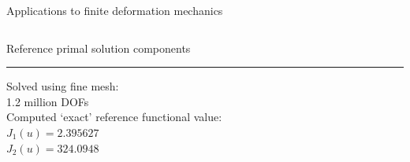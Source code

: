 \documentclass[fleqn]{beamer}
\begin{document}
\begin{frame}{Applications to finite deformation mechanics}
\begin{columns}
\begin{column}{0.6\textwidth}
\vspace{1em}
Reference primal solution components \\
\vspace{1em}
\hrule
\vspace{1em}
Solved using fine mesh: \\
1.2 million DOFs \\
\vspace{1em}
Computed `exact' reference functional value: \\ [8pt]
$J_1(u) = 2.395627$ \\
$J_2(u) = 324.0948$
\end{column}
\end{columns}
\end{frame}

\end{document}
